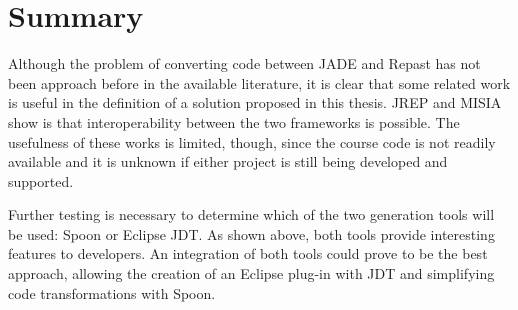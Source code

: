 \section{Summary}
Although the problem of converting code between JADE and Repast has not been approach before in the available literature, it is clear that some related work is useful in the definition of a solution proposed in this thesis. JREP and MISIA show is that interoperability between the two frameworks is possible. The usefulness of these works is limited, though, since the course code is not readily available and it is unknown if either project is still being developed and supported.

Further testing is necessary to determine which of the two generation tools will be used: Spoon or Eclipse JDT. As shown above, both tools provide interesting features to developers. An integration of both tools could prove to be the best approach, allowing the creation of an Eclipse plug-in with JDT and simplifying code transformations with Spoon.


